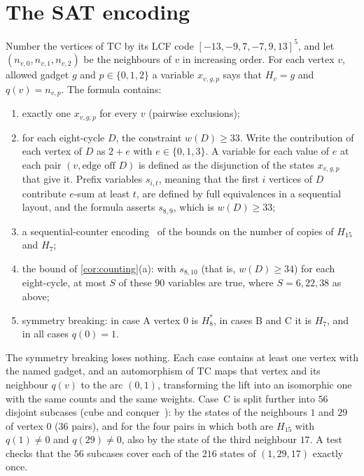 \documentclass[11pt]{amsart}
\theoremstyle{remark}
\newcommand{\Hseven}{H_7}
\newcommand{\Hfifteen}{H_{15}}
\newcommand{\Height}{H_8^{*}}
\newcommand{\TC}{\mathrm{TC}}
\begin{document}
\section{The SAT encoding}\label{sec:sat}

Number the vertices of $\TC$ by its LCF code $[-13,-9,7,-7,9,13]^5$, and let
$(n_{v,0},n_{v,1},n_{v,2})$ be the neighbours of $v$ in increasing order.
For each vertex $v$, allowed gadget $g$ and $p\in\{0,1,2\}$ a variable
$x_{v,g,p}$ says that $H_v=g$ and $q(v)=n_{v,p}$. The formula contains:
\begin{enumerate}[label=(\arabic*)]
\item exactly one $x_{v,g,p}$ for every $v$ (pairwise exclusions);
\item for each eight-cycle $D$, the constraint $w(D)\ge 33$. Write the
  contribution of each vertex of $D$ as $2+e$ with $e\in\{0,1,3\}$. A variable
  for each value of $e$ at each pair $(v,\text{edge off }D)$ is defined as the
  disjunction of the states $x_{v,g,p}$ that give it. Prefix variables
  $s_{i,t}$, meaning that the first $i$ vertices of $D$ contribute $e$-sum at
  least $t$, are defined by full equivalences in a sequential layout, and the
  formula asserts $s_{8,9}$, which is $w(D)\ge 33$;
\item a sequential-counter encoding~\cite{Sinz2005} of the bounds on the
  number of copies of $\Hfifteen$ and $\Hseven$;
\item the bound of \cref{cor:counting}(a): with $s_{8,10}$ (that is,
  $w(D)\ge 34$) for each eight-cycle, at most $S$ of these $90$ variables are
  true, where $S=6,22,38$ as above;
\item symmetry breaking: in case \textsf{A} vertex $0$ is $\Height$, in cases
  \textsf{B} and \textsf{C} it is $\Hseven$, and in all cases $q(0)=1$.
\end{enumerate}
The symmetry breaking loses nothing. Each case contains at least one vertex
with the named gadget, and an automorphism of $\TC$ maps that vertex and its
neighbour $q(v)$ to the arc $(0,1)$, transforming the lift into an isomorphic
one with the same counts and the same weights. Case~\textsf{C} is split
further into $56$ disjoint subcases (cube and
conquer~\cite{HeuleKullmannWieringaBiere2012}): by the states of the
neighbours $1$ and $29$ of vertex $0$ ($36$ pairs), and for the four pairs in
which both are $\Hfifteen$ with $q(1)\neq 0$ and $q(29)\neq 0$, also by the
state of the third neighbour $17$. A test checks that the $56$ subcases cover each of the
$216$ states of $(1,29,17)$ exactly once.
\end{document}
